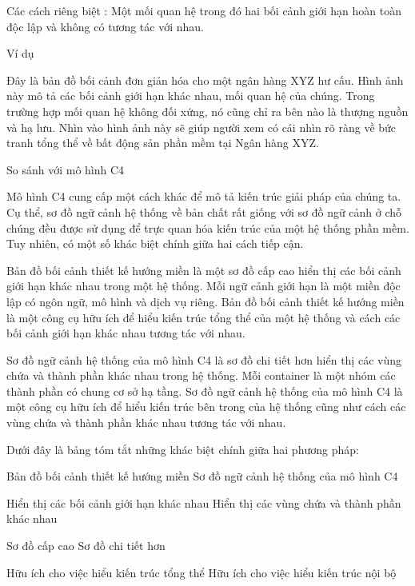 Các cách riêng biệt : Một mối quan hệ trong đó hai bối cảnh giới hạn hoàn toàn độc lập và không có tương tác với nhau.

Ví dụ

Đây là bản đồ bối cảnh đơn giản hóa cho một ngân hàng XYZ hư cấu. Hình ảnh này mô tả các bối cảnh giới hạn khác nhau, mối quan hệ của chúng. Trong trường hợp mối quan hệ không đối xứng, nó cũng chỉ ra bên nào là thượng nguồn và hạ lưu. Nhìn vào hình ảnh này sẽ giúp người xem có cái nhìn rõ ràng về bức tranh tổng thể về bất động sản phần mềm tại Ngân hàng XYZ.

So sánh với mô hình C4

Mô hình C4 cung cấp một cách khác để mô tả kiến trúc giải pháp của chúng ta. Cụ thể, sơ đồ ngữ cảnh hệ thống về bản chất rất giống với sơ đồ ngữ cảnh ở chỗ chúng đều được sử dụng để trực quan hóa kiến trúc của một hệ thống phần mềm. Tuy nhiên, có một số khác biệt chính giữa hai cách tiếp cận.

Bản đồ bối cảnh thiết kế hướng miền là một sơ đồ cấp cao hiển thị các bối cảnh giới hạn khác nhau trong một hệ thống. Mỗi ngữ cảnh giới hạn là một miền độc lập có ngôn ngữ, mô hình và dịch vụ riêng. Bản đồ bối cảnh thiết kế hướng miền là một công cụ hữu ích để hiểu kiến trúc tổng thể của một hệ thống và cách các bối cảnh giới hạn khác nhau tương tác với nhau.

Sơ đồ ngữ cảnh hệ thống của mô hình C4 là sơ đồ chi tiết hơn hiển thị các vùng chứa và thành phần khác nhau trong hệ thống. Mỗi container là một nhóm các thành phần có chung cơ sở hạ tầng. Sơ đồ ngữ cảnh hệ thống của mô hình C4 là một công cụ hữu ích để hiểu kiến trúc bên trong của hệ thống cũng như cách các vùng chứa và thành phần khác nhau tương tác với nhau.

Dưới đây là bảng tóm tắt những khác biệt chính giữa hai phương pháp:

Bản đồ bối cảnh thiết kế hướng miền 	Sơ đồ ngữ cảnh hệ thống của mô hình C4

Hiển thị các bối cảnh giới hạn khác nhau	Hiển thị các vùng chứa và thành phần khác nhau

Sơ đồ cấp cao	Sơ đồ chi tiết hơn

Hữu ích cho việc hiểu kiến trúc tổng thể	Hữu ích cho việc hiểu kiến trúc nội bộ